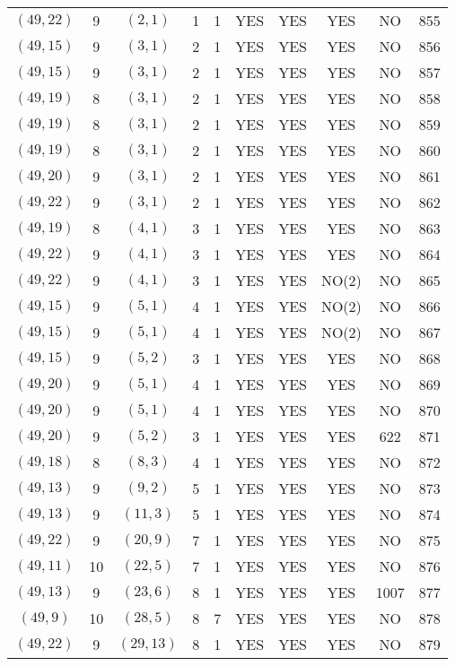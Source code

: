 \begin{longtable}{|c|c|c|c|c|c|c|c|c|c|}
$(49, 22)$ & 9 & $(2, 1)$ & 1 & 1 & YES & YES & YES & NO & 855\\
$(49, 15)$ & 9 & $(3, 1)$ & 2 & 1 & YES & YES & YES & NO & 856\\
$(49, 15)$ & 9 & $(3, 1)$ & 2 & 1 & YES & YES & YES & NO & 857\\
$(49, 19)$ & 8 & $(3, 1)$ & 2 & 1 & YES & YES & YES & NO & 858\\
$(49, 19)$ & 8 & $(3, 1)$ & 2 & 1 & YES & YES & YES & NO & 859\\
$(49, 19)$ & 8 & $(3, 1)$ & 2 & 1 & YES & YES & YES & NO & 860\\
$(49, 20)$ & 9 & $(3, 1)$ & 2 & 1 & YES & YES & YES & NO & 861\\
$(49, 22)$ & 9 & $(3, 1)$ & 2 & 1 & YES & YES & YES & NO & 862\\
$(49, 19)$ & 8 & $(4, 1)$ & 3 & 1 & YES & YES & YES & NO & 863\\
$(49, 22)$ & 9 & $(4, 1)$ & 3 & 1 & YES & YES & YES & NO & 864\\
$(49, 22)$ & 9 & $(4, 1)$ & 3 & 1 & YES & YES & NO(2) & NO & 865\\
$(49, 15)$ & 9 & $(5, 1)$ & 4 & 1 & YES & YES & NO(2) & NO & 866\\
$(49, 15)$ & 9 & $(5, 1)$ & 4 & 1 & YES & YES & NO(2) & NO & 867\\
$(49, 15)$ & 9 & $(5, 2)$ & 3 & 1 & YES & YES & YES & NO & 868\\
$(49, 20)$ & 9 & $(5, 1)$ & 4 & 1 & YES & YES & YES & NO & 869\\
$(49, 20)$ & 9 & $(5, 1)$ & 4 & 1 & YES & YES & YES & NO & 870\\
$(49, 20)$ & 9 & $(5, 2)$ & 3 & 1 & YES & YES & YES & 622 & 871\\
$(49, 18)$ & 8 & $(8, 3)$ & 4 & 1 & YES & YES & YES & NO & 872\\
$(49, 13)$ & 9 & $(9, 2)$ & 5 & 1 & YES & YES & YES & NO & 873\\
$(49, 13)$ & 9 & $(11, 3)$ & 5 & 1 & YES & YES & YES & NO & 874\\
$(49, 22)$ & 9 & $(20, 9)$ & 7 & 1 & YES & YES & YES & NO & 875\\
$(49, 11)$ & 10 & $(22, 5)$ & 7 & 1 & YES & YES & YES & NO & 876\\
$(49, 13)$ & 9 & $(23, 6)$ & 8 & 1 & YES & YES & YES & 1007 & 877\\
$(49, 9)$ & 10 & $(28, 5)$ & 8 & 7 & YES & YES & YES & NO & 878\\
$(49, 22)$ & 9 & $(29, 13)$ & 8 & 1 & YES & YES & YES & NO & 879\\

\end{longtable}
